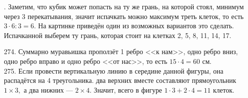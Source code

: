 \documentclass[12pt]{article}
\begin{document}
\begin{center}
\begin{figure}[ht!]
\end{figure}
\end{center}
\newpage{}. Заметим, что кубик может попасть на ту же грань, на которой стоял, минимум через 3 перекатывания, значит испачкать можно максимум треть клеток, то есть $3\cdot6:3=6.$ На картинке приведён один из возможных вариантов это сделать. Испачканной выберем ту грань, которая стоит на клетках 2, 5, 8, 11, 14, 17.
\begin{center}
\begin{figure}[ht!]
\end{figure}
\end{center}
274. Суммарно муравьишка проползёт 1 ребро <<к нам>>, одно ребро вниз, одно ребро вправо и одно ребро <<от нас>>, то есть $15\cdot4=60$ см.\\
275. Если провести вертикальную линию в середине данной фигуры, она распадётся на 4 треугольника. два верхних вместе составляют прямоугольник $1\times3,$ а два нижних --- $2\times4.$ Значит, всего в фигуре $1\cdot3+2\cdot4=11$ клеток.\\
\end{document}
